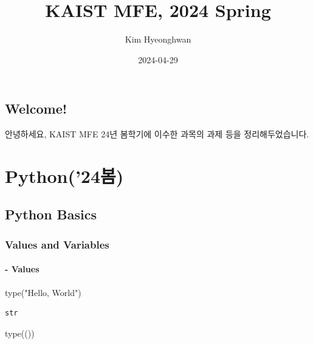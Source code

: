 \documentclass[
  a4paper,
  DIV=11,
  numbers=noendperiod]{scrreprt}
\title{KAIST MFE, 2024 Spring}
\author{Kim Hyeonghwan}
\date{2024-04-29}
\newenvironment{Shaded}{\begin{snugshade}}{\end{snugshade}}
\newcommand{\BuiltInTok}[1]{\textcolor[rgb]{0.00,0.23,0.31}{#1}}
\newcommand{\NormalTok}[1]{\textcolor[rgb]{0.00,0.23,0.31}{#1}}
\newcommand{\StringTok}[1]{\textcolor[rgb]{0.13,0.47,0.30}{#1}}
\renewcommand*\contentsname{Table of contents}
\newcommand\contentsname{Table of contents}
\begin{document}
\maketitle

\renewcommand*\contentsname{Table of contents}
{
\hypersetup{linkcolor=}
\setcounter{tocdepth}{2}
\tableofcontents
}

\chapter*{Welcome!}\label{welcome}


안녕하세요, KAIST MFE 24년 봄학기에 이수한 과목의 과제 등을
정리해두었습니다.

\part{Python('24봄)}

\chapter{Python Basics}\label{python-basics}

\section{Values and Variables}\label{values-and-variables}

\subsection{- Values}\label{values}

\begin{Shaded}
\begin{Highlighting}[]
\BuiltInTok{type}\NormalTok{(}\StringTok{"Hello, World"}\NormalTok{)}
\end{Highlighting}
\end{Shaded}

\begin{verbatim}
str
\end{verbatim}

\begin{Shaded}
\begin{Highlighting}[]
\BuiltInTok{type}\NormalTok{(())}
\end{Highlighting}
\end{Shaded}
\end{document}
